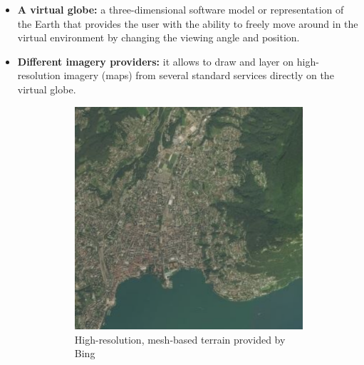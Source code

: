 \begin{itemize}
	\item {\bf A virtual globe:} a three-dimensional software model or representation of the Earth that provides the user with the ability to freely move around in the virtual environment by changing the viewing angle and position.
	\item {\bf Different imagery providers:} it allows to draw and layer on high-resolution imagery (maps) from several standard services directly on the virtual globe. 
	\begin{figure} [h]
		\centering
		\begin{subfigure}[b]{0.3\textwidth}
			\includegraphics[width=1\textwidth]{chapter2/images/Bing-Map}
			\caption{High-resolution, mesh-based terrain provided by Bing}
			\label{fig:Bing-Map}
		\end{subfigure}
		 \qquad
		\begin{subfigure}[b]{0.3\textwidth}

\end{subfigure}
\end{figure}
\end{itemize}
